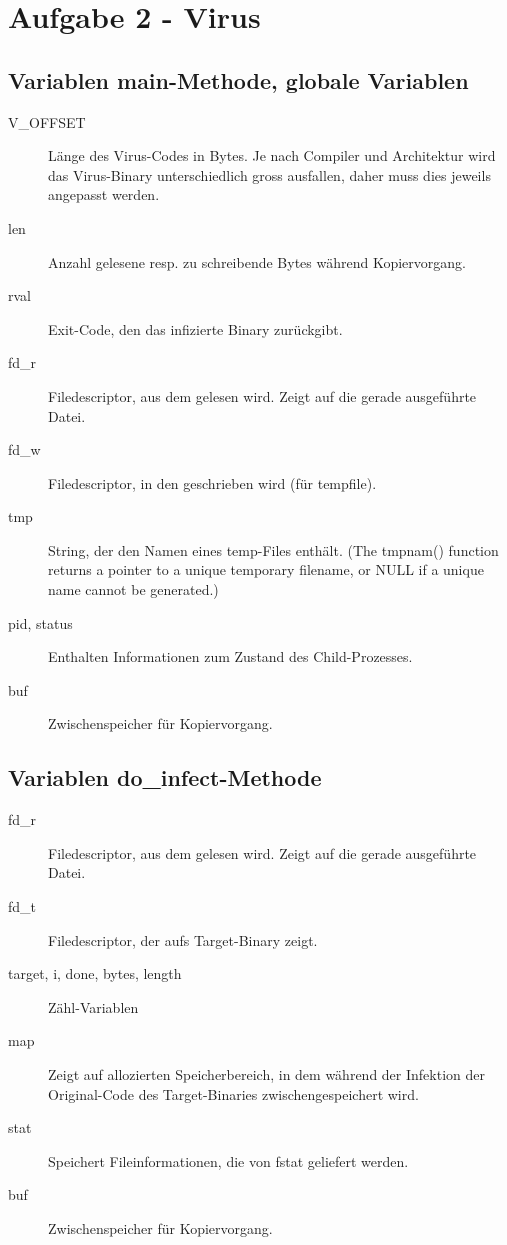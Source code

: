 \documentclass[a4paper,11pt,parskip=half]{scrartcl}
\begin{document}
\section{Aufgabe 2 - Virus}
\subsection{Variablen main-Methode, globale Variablen}
\begin{description}
	\item[V\_OFFSET] Länge des Virus-Codes in Bytes. Je nach Compiler und Architektur wird das Virus-Binary unterschiedlich gross ausfallen, daher muss dies jeweils angepasst werden.
	\item[len] Anzahl gelesene resp. zu schreibende Bytes während Kopiervorgang.
	\item[rval] Exit-Code, den das infizierte Binary zurückgibt.
	\item[fd\_r] Filedescriptor, aus dem gelesen wird. Zeigt auf die gerade ausgeführte Datei.
	\item[fd\_w] Filedescriptor, in den geschrieben wird (für tempfile).
	\item[tmp] String, der den Namen eines temp-Files enthält. (\glqq{}The tmpnam() function returns a pointer to a unique temporary filename, or NULL if a unique name cannot be generated.\grqq{})
	\item[pid, status] Enthalten Informationen zum Zustand des Child-Prozesses.
	\item[buf] Zwischenspeicher für Kopiervorgang.
\end{description}

\subsection{Variablen do\_infect-Methode}
\begin{description}
	\item[fd\_r] Filedescriptor, aus dem gelesen wird. Zeigt auf die gerade ausgeführte Datei.
	\item[fd\_t] Filedescriptor, der aufs Target-Binary zeigt.
	\item[target, i, done, bytes, length] Zähl-Variablen
	\item[map] Zeigt auf allozierten Speicherbereich, in dem während der Infektion der Original-Code des Target-Binaries zwischengespeichert wird.
	\item[stat] Speichert Fileinformationen, die von fstat geliefert werden.
	\item[buf] Zwischenspeicher für Kopiervorgang.
\end{description}
\end{document}
